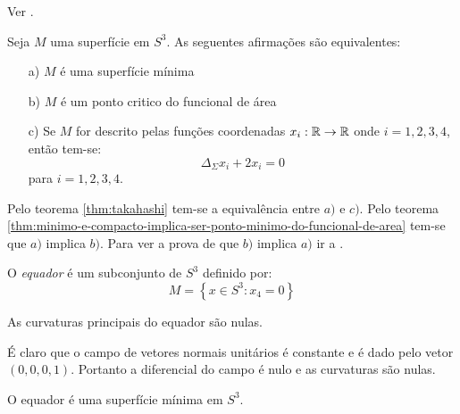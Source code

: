 \begin{demonstracao}
	Ver \cite[Theorem 3.2.1]{Simons1968}.
\end{demonstracao}

\begin{teorema}\label{propriedades_sup_min_S3}
	Seja $M$ uma superfície em $S^3$. As seguentes afirmações são equivalentes:
	\begin{enumerate}
		\item[a)] $M$ é uma superfície mínima
		\item[b)] $M$ é um ponto critico do funcional de área
		\item[c)] Se $M$ for descrito pelas funções coordenadas $x_i: \mathbb{R} \rightarrow \mathbb{R}$ onde $i=1,2,3,4$, então tem-se:
		\begin{equation*}
		\Delta_{\Sigma} x_i + 2 x_i = 0
		\end{equation*}
		para $i=1,2,3,4$.
	\end{enumerate}
\end{teorema}

\begin{demonstracao}
	Pelo teorema \ref{thm:takahashi} tem-se a equivalência entre $a)$ e $c)$. Pelo teorema \ref{thm:minimo-e-compacto-implica-ser-ponto-minimo-do-funcional-de-area} tem-se que $a)$ implica $b)$. Para ver a prova de que $b)$ implica $a)$ ir a \cite[\S 2.4]{Simons1968}.
\end{demonstracao}

\begin{definicao}
	O \emph{equador} é um subconjunto de $S^3$ definido por:
	\begin{equation}
	M = \left\{ x \in S^3: x_4 = 0 \right\}
	\end{equation}
\end{definicao}

\begin{proposicao}
	As curvaturas principais do equador são nulas.
\end{proposicao}

\begin{demonstracao}
	É claro que o campo de vetores normais unitários é constante e é dado pelo vetor $(0,0,0,1)$. Portanto a diferencial do campo é nulo e as curvaturas são nulas.
\end{demonstracao}

\begin{corolario}
	O equador é uma superfície mínima em $S^3$.
\end{corolario}

